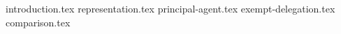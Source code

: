 {introduction.tex}
{representation.tex}
{principal-agent.tex}
{exempt-delegation.tex}
{comparison.tex}